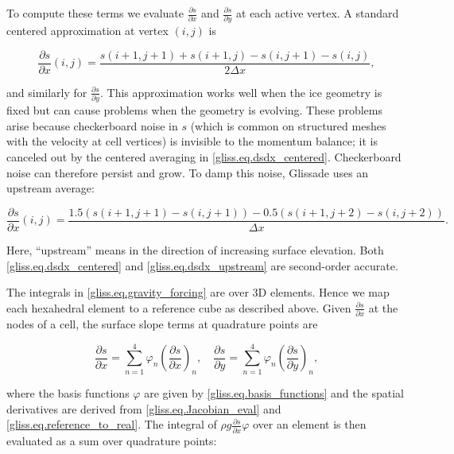 \noindent
To compute these terms we evaluate $\frac{\partial s}{\partial x}$ and $\frac{\partial s}{\partial y}$
at each active vertex.  A standard centered approximation at vertex $(i,j)$ is

\begin{equation}
  \label{gliss.eq.dsdx_centered}
  \frac{\partial s}{\partial x}(i,j) = \frac{s(i+1,j+1)+s(i+1,j)-s(i,j+1)-s(i,j)}{2\Delta x},
\end{equation}

\noindent
and similarly for $\frac{\partial s}{\partial y}$. This approximation works
well when the ice geometry is fixed but can cause problems when the geometry is evolving.
These problems arise because checkerboard noise in $s$ (which is common on structured meshes
with the velocity at cell vertices) is invisible to the momentum balance; 
it is canceled out by the centered averaging in \eqref{gliss.eq.dsdx_centered}.
Checkerboard noise can therefore persist and grow.  To damp this noise, Glissade uses an upstream average:

\begin{equation}
  \label{gliss.eq.dsdx_upstream}
  \frac{\partial s}{\partial x}(i,j) = \frac{1.5 (s(i+1,j+1) - s(i,j+1)) - 0.5 (s(i+1,j+2) - s(i,j+2))}{\Delta x}.
\end{equation}

\noindent
Here, ``upstream'' means in the direction of increasing surface elevation. Both \eqref{gliss.eq.dsdx_centered}
and \eqref{gliss.eq.dsdx_upstream} are second-order accurate.

The integrals in \eqref{gliss.eq.gravity_forcing} are over 3D elements.
Hence we map each hexahedral element to a reference cube as described above. 
Given $\frac{\partial s}{\partial x}$ at the nodes of a cell,
the surface slope terms at quadrature points are

\begin{equation}
  \frac{\partial s}{\partial x} = \sum\limits_{n=1}^{4}{{{\varphi }_{n}}}{{\left( \frac{\partial s}{\partial x} \right)}_{n}}, \quad
  \frac{\partial s}{\partial y} = \sum\limits_{n=1}^{4}{{{\varphi }_{n}}}{{\left( \frac{\partial s}{\partial y} \right)}_{n}},
\end{equation}

\noindent
where the basis functions $\varphi$ are given by \eqref{gliss.eq.basis_functions}
and the spatial derivatives are derived from \eqref{gliss.eq.Jacobian_eval} and \eqref{gliss.eq.reference_to_real}.
The integral of $\rho g \frac{\partial s}{\partial x} \varphi$
over an element is then evaluated as a sum over quadrature points:

